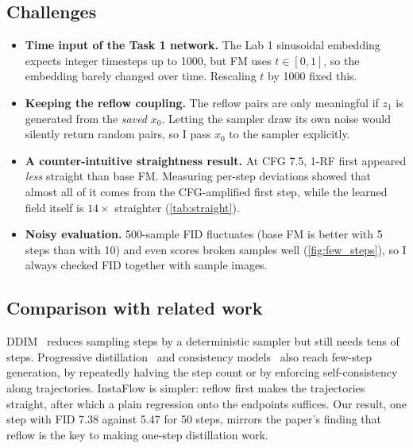 \subsection{Challenges}
\begin{itemize}
  \item \textbf{Time input of the Task 1 network.} The Lab 1 sinusoidal embedding expects integer timesteps up to 1000, but FM uses $t\in[0,1]$, so the embedding barely changed over time. Rescaling $t$ by 1000 fixed this.
  \item \textbf{Keeping the reflow coupling.} The reflow pairs are only meaningful if $z_1$ is generated from the \emph{saved} $x_0$. Letting the sampler draw its own noise would silently return random pairs, so I pass $x_0$ to the sampler explicitly.
  \item \textbf{A counter-intuitive straightness result.} At CFG 7.5, 1-RF first appeared \emph{less} straight than base FM. Measuring per-step deviations showed that almost all of it comes from the CFG-amplified first step, while the learned field itself is $14\times$ straighter (\cref{tab:straight}).
  \item \textbf{Noisy evaluation.} 500-sample FID fluctuates (\eg base FM is better with 5 steps than with 10) and even scores broken samples well (\cref{fig:few_steps}), so I always checked FID together with sample images.
\end{itemize}

\subsection{Comparison with related work}
DDIM~\cite{song2021ddim} reduces sampling steps by a deterministic sampler but still needs tens of steps.
Progressive distillation~\cite{salimans2022progressive} and consistency models~\cite{song2023consistency} also reach few-step generation, by repeatedly halving the step count or by enforcing self-consistency along trajectories.
InstaFlow is simpler: reflow first makes the trajectories straight, after which a plain regression onto the endpoints suffices.
Our result, one step with FID 7.38 against 5.47 for 50 steps, mirrors the paper's finding that reflow is the key to making one-step distillation work.
